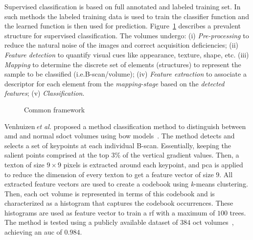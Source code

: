 Supervised classification is based on full annotated and labeled training set.
In such methods the labeled training data is used to train the classifier function and the learned function is then used for prediction.
%
Figure~\ref{fig:ML-scheme} describes a prevalent structure for supervised classification.
The volumes undergo:
(i) \emph{Pre-processing} to reduce the natural noise of the images and correct acquisition deficiencies;
(ii) \emph{Feature detection} to quantify visual cues like appearance, texture, shape, etc.
(iii) \emph{Mapping} to determine the discrete set of elements (structures) to represent the sample to be classified (i.e.B-scan/volume);
(iv) \emph{Feature extraction} to associate a descriptor for each element from the \emph{mapping-stage} based on the \emph{detected features};
(v) \emph{Classification}.


\begin{figure}
  \caption{Common framework}
  \label{fig:ML-scheme}
\end{figure}

%
Venhuizen\,\textit{et al.} proposed a method classification method to distinguish between \gls{amd} and normal \gls{sdoct} volumes using \gls{bow} models~\cite{Venhuizen2015}.
%
The method detects and selects a set of keypoints at each individual B-scan.
Essentially, keeping the salient points comprised at the top $3\%$ of the vertical gradient values.
Then, a texton of size $9 \times 9$ pixels is extracted around each keypoint, and \gls{pca} is applied to reduce the dimension of every texton to get a feature vector of size $9$.
All extracted feature vectors are used to create a codebook using \textit{k}-means clustering.
Then, each \gls{oct} volume is represented in terms of this codebook and is characterized as a histogram that captures the codebook occurrences.
These histograms are used as feature vector to train a \gls{rf} with a maximum of $100$ trees.
%
The method is tested using a publicly available dataset of $384$ \gls{oct} volumes~\cite{VENHUIZEN_DATASET}, achieving an \gls{auc} of $0.984$.

